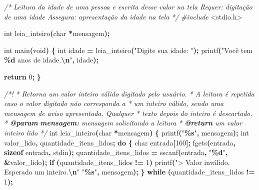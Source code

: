 \documentclass[
  11pt,
  a4paper,
]{scrbook}
\newenvironment{Shaded}{\begin{snugshade}}{\end{snugshade}}
\newcommand{\AnnotationTok}[1]{\textcolor[rgb]{0.56,0.35,0.01}{\textbf{\textit{#1}}}}
\newcommand{\CommentTok}[1]{\textcolor[rgb]{0.56,0.35,0.01}{\textit{#1}}}
\newcommand{\CommentVarTok}[1]{\textcolor[rgb]{0.56,0.35,0.01}{\textbf{\textit{#1}}}}
\newcommand{\ControlFlowTok}[1]{\textcolor[rgb]{0.13,0.29,0.53}{\textbf{#1}}}
\newcommand{\DataTypeTok}[1]{\textcolor[rgb]{0.13,0.29,0.53}{#1}}
\newcommand{\DecValTok}[1]{\textcolor[rgb]{0.00,0.00,0.81}{#1}}
\newcommand{\ImportTok}[1]{#1}
\newcommand{\KeywordTok}[1]{\textcolor[rgb]{0.13,0.29,0.53}{\textbf{#1}}}
\newcommand{\NormalTok}[1]{#1}
\newcommand{\OperatorTok}[1]{\textcolor[rgb]{0.81,0.36,0.00}{\textbf{#1}}}
\newcommand{\PreprocessorTok}[1]{\textcolor[rgb]{0.56,0.35,0.01}{\textit{#1}}}
\newcommand{\SpecialCharTok}[1]{\textcolor[rgb]{0.81,0.36,0.00}{\textbf{#1}}}
\newcommand{\StringTok}[1]{\textcolor[rgb]{0.31,0.60,0.02}{#1}}
\begin{document}
\begin{Shaded}
\begin{Highlighting}[]
\CommentTok{/*}
\CommentTok{Leitura da idade de uma pessoa e escrita desse valor na tela}
\CommentTok{Requer: digitação de uma idade}
\CommentTok{Assegura: apresentação da idade na tela}
\CommentTok{*/}
\PreprocessorTok{\#include }\ImportTok{\textless{}stdio.h\textgreater{}}

\DataTypeTok{int}\NormalTok{ leia\_inteiro}\OperatorTok{(}\DataTypeTok{char} \OperatorTok{*}\NormalTok{mensagem}\OperatorTok{);}

\DataTypeTok{int}\NormalTok{ main}\OperatorTok{(}\DataTypeTok{void}\OperatorTok{)} \OperatorTok{\{}
    \DataTypeTok{int}\NormalTok{ idade }\OperatorTok{=}\NormalTok{ leia\_inteiro}\OperatorTok{(}\StringTok{"Digite sua idade: "}\OperatorTok{);}
\NormalTok{    printf}\OperatorTok{(}\StringTok{"Você tem }\SpecialCharTok{\%d}\StringTok{ anos de idade.}\SpecialCharTok{\textbackslash{}n}\StringTok{"}\OperatorTok{,}\NormalTok{ idade}\OperatorTok{);}

    \ControlFlowTok{return} \DecValTok{0}\OperatorTok{;}
\OperatorTok{\}}

\CommentTok{/*!}
\CommentTok{ * Retorna um valor inteiro válido digitado pelo usuário.}
\CommentTok{ * A leitura é repetida caso o valor digitado não corresponda a}
\CommentTok{ * um inteiro válido, sendo uma mensagem de aviso apresentada. Qualquer}
\CommentTok{ * texto depois do inteiro é descartado.}
\CommentTok{ * }\AnnotationTok{@param}\CommentTok{ }\CommentVarTok{mensagem:}\CommentTok{ mensagem solicitando a leitura}
\CommentTok{ * }\AnnotationTok{@return}\CommentTok{ um valor inteiro lido}
\CommentTok{ */}
\DataTypeTok{int}\NormalTok{ leia\_inteiro}\OperatorTok{(}\DataTypeTok{char} \OperatorTok{*}\NormalTok{mensagem}\OperatorTok{)} \OperatorTok{\{}
\NormalTok{    printf}\OperatorTok{(}\StringTok{"}\SpecialCharTok{\%s}\StringTok{"}\OperatorTok{,}\NormalTok{ mensagem}\OperatorTok{);}
    \DataTypeTok{int}\NormalTok{ valor\_lido}\OperatorTok{,}\NormalTok{ quantidade\_itens\_lidos}\OperatorTok{;}
    \ControlFlowTok{do} \OperatorTok{\{}
        \DataTypeTok{char}\NormalTok{ entrada}\OperatorTok{[}\DecValTok{160}\OperatorTok{];}
\NormalTok{        fgets}\OperatorTok{(}\NormalTok{entrada}\OperatorTok{,} \KeywordTok{sizeof}\NormalTok{ entrada}\OperatorTok{,}\NormalTok{ stdin}\OperatorTok{);}
\NormalTok{        quantidade\_itens\_lidos }\OperatorTok{=}\NormalTok{ sscanf}\OperatorTok{(}\NormalTok{entrada}\OperatorTok{,} \StringTok{"}\SpecialCharTok{\%d}\StringTok{"}\OperatorTok{,} \OperatorTok{\&}\NormalTok{valor\_lido}\OperatorTok{);}
        \ControlFlowTok{if} \OperatorTok{(}\NormalTok{quantidade\_itens\_lidos }\OperatorTok{!=} \DecValTok{1}\OperatorTok{)}
\NormalTok{            printf}\OperatorTok{(}\StringTok{"\textgreater{} Valor inválido. Esperado um inteiro.}\SpecialCharTok{\textbackslash{}n}\StringTok{"}
                   \StringTok{"}\SpecialCharTok{\%s}\StringTok{"}\OperatorTok{,}\NormalTok{ mensagem}\OperatorTok{);}
    \OperatorTok{\}} \ControlFlowTok{while} \OperatorTok{(}\NormalTok{quantidade\_itens\_lidos }\OperatorTok{!=} \DecValTok{1}\OperatorTok{);}


\end{Highlighting}
\end{Shaded}
\end{document}
